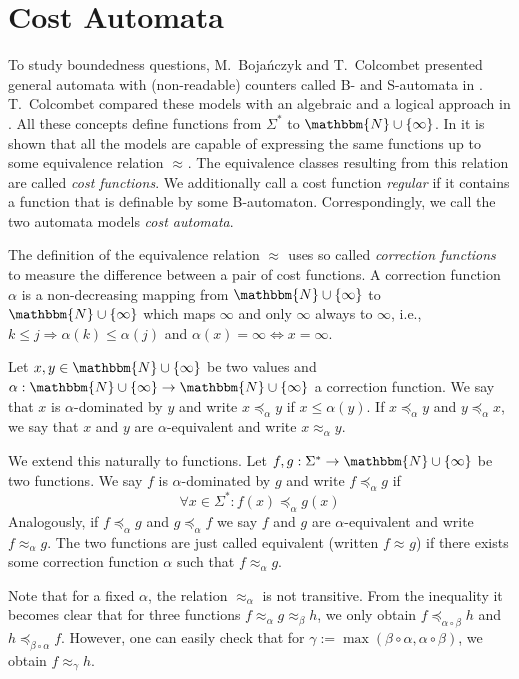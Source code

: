 \documentclass{LMCS}
\newcommand{\nat}{\mathbbm{N}}
\newcommand{\Equiv}{\Leftrightarrow}
\newcommand{\Implies}{\Rightarrow}
\newcommand{\natInf}{\nat \cup \{ \infty \}}
\newcommand{\costlea}[1][\alpha]{\preceq_{#1}}
\newcommand{\costEquiv}[1][\alpha]{\approx_{#1}}
\begin{document}
\section{Cost Automata}
\label{sec:Preliminaries}



To study boundedness questions, M.~Bojańczyk and T.~Colcombet
presented general automata with (non-readable) counters called B- and
S-automata in \cite{bounds-in-omega-regularity}. T.~Colcombet compared these
models with an algebraic and a logical approach in \cite{regularcostfunctions}.
All these concepts define functions from $\Sigma^*$ to $\natInf$. In 
\cite{regularcostfunctions} it is shown that all the models are capable of 
expressing the same functions up to some equivalence relation $\costEquiv[]$. 
The equivalence classes resulting from this relation are called 
\emph{cost functions}. We additionally call a cost function \emph{regular} if
it contains a function that is definable by some B-automaton. Correspondingly,
we call the two automata models \emph{cost automata}.

The definition of the equivalence relation $\costEquiv[]$  uses so called
\emph{correction functions} to measure the difference between a pair of cost
functions. A correction function $\alpha$ is a non-decreasing mapping from
$\natInf$ to $\natInf$ which maps $\infty$ and only $\infty$ always to $\infty$,
i.e., $k \le j \Implies \alpha(k) \le \alpha(j)$ and $\alpha(x) = \infty \Equiv
x = \infty$.
\begin{defi}
	Let $x,y \in \natInf$ be two values and $\alpha: \natInf
	\to \natInf$ a correction function. We say that $x$ is $\alpha$-dominated
	by $y$ and write $x \costlea y$ if $x \le \alpha(y)$. If $x \costlea y$ 
	and $y \costlea x$, we say that $x$ and $y$ are $\alpha$-equivalent and
	write $x \costEquiv y$.

	We extend this naturally  to functions. Let $f,g: \Sigma^* \to \natInf$ be 
	two functions. We say $f$ is $\alpha$-dominated by $g$ and write 
	$f \costlea g$ if 
	\[ \forall x \in \Sigma^*: f(x) \costlea g(x) \]
	Analogously, if $f \costlea g$ and $g \costlea f$ we say $f$ and $g$ are
	$\alpha$-equivalent and write $f \costEquiv g$. The two functions are just
	called equivalent (written $f \costEquiv[] g$) if there exists some
	correction function $\alpha$ such that $f \costEquiv g$.
\end{defi}
Note that for a fixed $\alpha$, the relation $\costEquiv$ is not transitive.
From the inequality it becomes clear that for three functions $f \costEquiv g
\costEquiv[\beta] h$, we only obtain $f \costlea[\alpha \circ \beta] h$ and $h
\costlea[\beta \circ \alpha] f$. However, one can easily check that for $\gamma
:= \max(\beta \circ \alpha,\alpha \circ\beta)$, we obtain $f \costEquiv[\gamma]
h$. 
\end{document}
